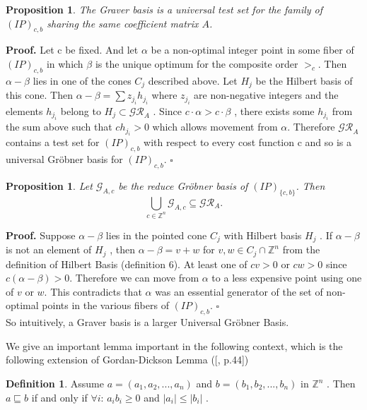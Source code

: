 \documentclass{article}
\theoremstyle{plain}
\newtheorem{proposition}[theorem]{Proposition}
\theoremstyle{definition}
\newtheorem{definition}[theorem]{Definition}
\begin{document}
\begin{proposition} The Graver basis is a universal test set for the family of  $(IP)_{c,b}$ sharing the same coefficient matrix $A$.  
\end{proposition}

\noindent\textbf{Proof.} Let  c  be fixed.  And let  $\alpha$  be a non-optimal integer point in some fiber of  $(IP)_{c,b}$  in which  $\beta$  is the unique optimum for the composite order $>_c$. Then  $\alpha-\beta$  lies in one of the cones  $C_{j}$  described above. Let  $H_{j}$  be the Hilbert basis of this cone. Then $ \alpha-\beta=\sum z_{j_{i}} h_{j_{i}}$  where  $z_{j_{i}}$  are non-negative integers and the elements  $h_{j_{i}}$  belong to $ H_{j} \subset \mathcal{GR}_A$ . Since  $c \cdot \alpha>c \cdot \beta$ , there exists some  $h_{j_{i}}$  from the sum above such that  $c h_{j_{i}}>0$  which allows movement from  $\alpha$. Therefore  $\mathcal{GR}_{A}$  contains a test set for $(IP)_{c,b} $  with respect to every cost function  c  and so is a universal Gröbner basis for $(IP)_{c,b} $. \hfill $\square$ 

\begin{proposition}Let $\mathcal{G}_{A, c}$ be the reduce  Gröbner basis of $(IP)_{\{c,b\}}$. Then $$ \bigcup_{c \in \mathbb{Z}^{n}} \mathcal{G}_{A, c} \subseteq \mathcal{G} \mathcal{R}_{A} .$$
\end{proposition}

\noindent\textbf{Proof.} Suppose  $\alpha-\beta$  lies in the pointed cone  $C_{j}$  with Hilbert basis  $H_{j}$ . If  $\alpha-\beta$  is not an element of  $H_{j}$ , then  $\alpha-\beta=v+w$  for  $v, w \in C_{j} \cap \mathbb{Z}^{n}$ from the definition of Hilbert Basis (definition 6). At least one of  $c v>0 $ or  $c w>0$  since  $c(\alpha-\beta)>0$. Therefore we can move from  $\alpha$  to a less expensive point using one of $ v $ or  $w$. This contradicts that  $\alpha$  was an essential generator of the set of non-optimal points in the various fibers of  $(IP)_{c,b}$. \hfill $\square$ \\

So intuitively, a Graver basis is a larger Universal Gröbner Basis.

We give an important lemma important in the following context, which is the following extension of Gordan-Dickson Lemma  ([\cite{ref9}, p.44]) 

\begin{definition} Assume $a=(a_1,a_2,...,a_n)$ and $b=(b_1,b_2,...,b_n)$ in $\mathbb{Z}^{n}$ . Then  $a \sqsubseteq b$ if and only if  $\forall i$:  $a_{i} b_{i} \geq 0 $ and $\left|a_{i}\right| \leq\left|b_{i}\right|$ . 
\end{definition}
\end{document}
